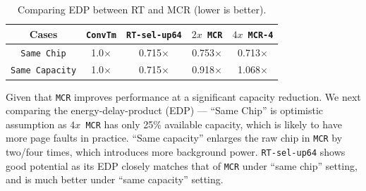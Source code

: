 \begin{table}[htbp]
\vspace{-0.2in}
\caption{Comparing EDP between RT and MCR (lower is better).}
\vspace{-0.3in}
\begin{center}
\scalebox{0.8}
{
\begin{tabular}{*5c}
\hline\hline
Cases		& {\tt ConvTm} & {\tt RT-sel-up64}	& {\tt $2x$ MCR}	&{\tt$4x$ MCR-4}\\
\hline
\texttt{Same Chip}	& 1.0$\times$ &0.715$\times$		&0.753$\times$		&0.713$\times$\\
\texttt{Same Capacity}	& 1.0$\times$  &0.715$\times$		&0.918$\times$		&1.068$\times$\\
\hline\hline

\end{tabular}
}
\end{center}
\label{tab:edp}
\vspace{-0.45in}
\end{table}

Given that {\tt MCR} improves performance at a significant capacity reduction.
We next comparing the energy-delay-product (EDP) --- ``Same Chip'' is optimistic assumption as {\tt $4x$ MCR} has only 25\% available capacity, which is likely to have more page faults in practice. ``Same capacity'' enlarges the raw chip in {\tt MCR} by two/four times, which introduces more background power. {\tt RT-sel-up64} shows good potential as its EDP closely matches that of {\tt MCR} under ``same chip'' setting, and is much better under ``same capacity'' setting.

 


